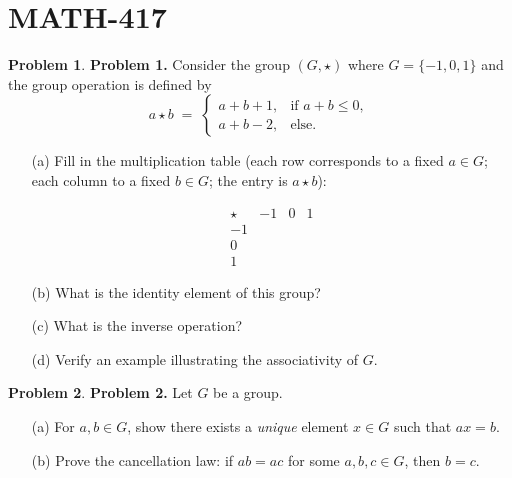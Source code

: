 \documentclass[10pt]{article}
\theoremstyle{definition} %
\newtheorem{problem}{Problem}
\theoremstyle{plain} %
\begin{document}
  \section{MATH-417}
\begin{problem}
  \textbf{Problem 1.}
  Consider the group \((G,\star)\) where \(G=\{-1,0,1\}\) and the group
  operation is defined by
  \[
     a\star b \;=\;
     \begin{cases}
       a+b+1, & \text{if } a+b\le 0,\\[4pt]
       a+b-2, & \text{else.}
     \end{cases}
  \]
  \begin{enumerate}
    \item[(a)] Fill in the multiplication table
          (each row corresponds to a fixed \(a\in G\);
          each column to a fixed \(b\in G\);
          the entry is \(a\star b\)):
  
          \[
          \begin{array}{c|ccc}
            \star & -1 & 0 & 1\\\hline
            -1 & \boxed{\phantom{0}} & \boxed{\phantom{0}} & \boxed{\phantom{0}}\\
             0  & \boxed{\phantom{0}} & \boxed{\phantom{0}} & \boxed{\phantom{0}}\\
             1  & \boxed{\phantom{0}} & \boxed{\phantom{0}} & \boxed{\phantom{0}}
          \end{array}
          \]
  
    \item[(b)] What is the identity element of this group?
    \item[(c)] What is the inverse operation?
    \item[(d)] Verify an example illustrating the associativity of \(G\).
  \end{enumerate}
  \end{problem}
  
  \bigskip
  \begin{problem}
  \textbf{Problem 2.}
  Let \(G\) be a group.
  \begin{enumerate}
    \item[(a)] For \(a,b\in G\), show there exists a \emph{unique} element
              \(x\in G\) such that \(ax=b\).
    \item[(b)] Prove the cancellation law:
              if \(ab=ac\) for some \(a,b,c\in G\), then \(b=c\).
  \end{enumerate}
  \end{problem}
  
\end{document}
